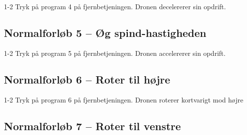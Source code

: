 \documentclass[Main]{subfiles}
\begin{document}
\begin{TestCase}
\TC
{1-2}
{Tryk på program 4 på fjernbetjeningen.}
{Dronen decelererer sin opdrift.}
{}
\end{TestCase}




\subsection*{Normalforløb 5 -- Øg spind-hastigheden}

\begin{TestCaseIntro}
\end{TestCaseIntro}

\begin{TestCase}
\TC
{1-2}
{Tryk på program 5 på fjernbetjeningen.}
{Dronen accelererer sin opdrift.}
{}
\end{TestCase}






\subsection*{Normalforløb 6 -- Roter til højre}

\begin{TestCaseIntro}
\end{TestCaseIntro}

\begin{TestCase}
\TC
{1-2}
{Tryk på program 6 på fjernbetjeningen.}
{Dronen roterer kortvarigt mod højre}
{}
\end{TestCase}



\newpage
\subsection*{Normalforløb 7 -- Roter til venstre}

\begin{TestCaseIntro}
\end{TestCaseIntro}
\end{document}

